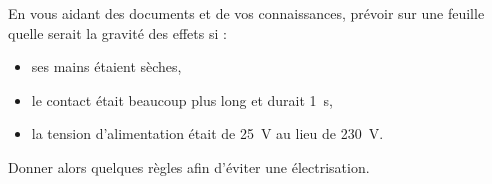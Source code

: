 \numeroQuestion
En vous aidant des documents et de vos connaissances, prévoir sur une feuille quelle serait la gravité des effets si :
\begin{itemize}
  \item ses mains étaient sèches,
  \item le contact était beaucoup plus long et durait \qty{1}{\s},
  \item la tension d'alimentation était de \qty{25}{\volt} au lieu de \qty{230}{\volt}.
\end{itemize}
Donner alors quelques règles afin d’éviter une électrisation.